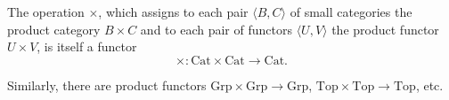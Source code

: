 The operation $\times$, which assigns to each pair $\langle B, C \rangle$ of small categories the product category $B \times C$ and to each pair of functors $\langle U, V \rangle$ the product functor $U \times V$, is itself a functor
$$\times: \text{Cat} \times \text{Cat} \to \text{Cat}.$$

Similarly, there are product functors $\text{Grp} \times \text{Grp} \to \text{Grp}$, $\text{Top} \times \text{Top} \to \text{Top}$, etc.
